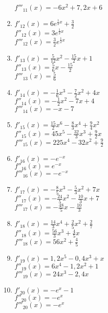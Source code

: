 \begin{Answer}[ref=hoehereAbleitungenA1]
\begin{enumerate}[label=\alph*)]
		\(f'''_{11}(x)=-6x^2+7,2x+6\)
		\item \(f'_{12}(x)=6e^{\frac{1}{2}x}+\frac{3}{2}\)\\
		\(f''_{12}(x)=3e^{\frac{1}{2}x}\)\\
		\(f'''_{12}(x)=\frac{3}{2}e^{\frac{1}{2}x}\)
		\item \(f'_{13}(x)=\frac{5}{12}x^2-\frac{15}{2}x+1\)\\
		\(f''_{13}(x)=\frac{5}{6}x-\frac{15}{2}\)\\
		\(f'''_{13}(x)=\frac{5}{6}\)
		\item \(f'_{14}(x)=-\frac{1}{6}x^3-\frac{7}{2}x^2+4x\)\\
		\(f''_{14}(x)=-\frac{1}{2}x^2-7x+4\)\\
		\(f'''_{14}(x)=-x-7\)
		\item \(f'_{15}(x)=\frac{15}{2}x^6-\frac{8}{3}x^4+\frac{9}{4}x^2\)\\
		\(f''_{15}(x)=45x^5-\frac{32}{3}x^3+\frac{9}{2}x\)\\
		\(f'''_{15}(x)=225x^4-32x^2+\frac{9}{2}\)
		\item \(f'_{16}(x)=-e^{-x}\)\\
		\(f''_{16}(x)=e^{-x}\)\\
		\(f'''_{16}(x)=-e^{-x}\)
		\item \(f'_{17}(x)=-\frac{8}{5}x^3-\frac{5}{3}x^2+7x\)\\
		\(f''_{17}(x)=-\frac{24}{5}x^2-\frac{10}{3}x+7\)\\
		\(f'''_{17}(x)=-\frac{48}{5}x-\frac{10}{3}\)
		\item \(f'_{18}(x)=\frac{14}{3}x^4+\frac{2}{5}x^2+\frac{2}{7}\)\\
		\(f''_{18}(x)=\frac{56}{3}x^3+\frac{4}{5}x\)\\
		\(f'''_{18}(x)=56x^2+\frac{4}{5}\)
		\item \(f'_{19}(x)=1,2x^5-0,4x^3+x\)\\
		\(f''_{19}(x)=6x^4-1,2x^2+1\)\\
		\(f'''_{19}(x)=24x^3-2,4x\)
		\item \(f'_{20}(x)=-e^{x}-1\)\\
		\(f''_{20}(x)=-e^{x}\)\\
		\(f'''_{20}(x)=-e^{x}\)
	\end{enumerate}
\end{Answer}